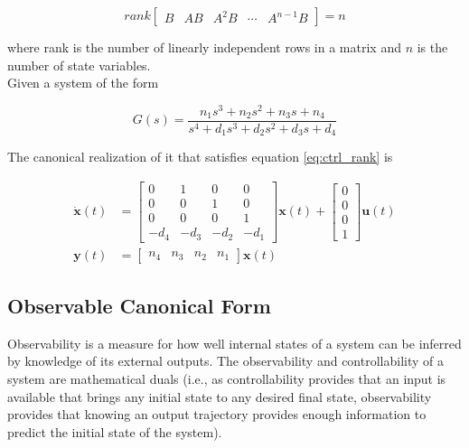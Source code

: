 \documentclass[10pt,conference,compsoc]{IEEEtran}
\newcommand{\mtx}[1] {\bm #1}
\begin{document}
\begin{equation}
  rank \left[
  \begin{array}{ccccc}
    B & AB & A^2B & \cdots & A^{n-1}B
  \end{array}
  \right] = n
  \label{eq:ctrl_rank}
\end{equation}

\noindent where rank is the number of linearly independent rows in a matrix and
$n$ is the number of state variables. \\

\noindent Given a system of the form

\begin{equation}
  G(s) = \frac{n_1 s^3 + n_2 s^2 + n_3 s + n_4}
    {s^4 + d_1 s^3 + d_2 s^2 + d_3 s + d_4}
  \label{eq:ctrl_obsv_tf}
\end{equation}

\noindent The canonical realization of it that satisfies equation
\ref{eq:ctrl_rank} is

\begin{align}
  \dot{\mtx{x}}(t) &= \left[
  \begin{array}{cccc}
    0 & 1 & 0 & 0 \\
    0 & 0 & 1 & 0 \\
    0 & 0 & 0 & 1 \\
    -d_4 & -d_3 & -d_2 & -d_1
  \end{array}
  \right] \mtx{x}(t) + \left[
  \begin{array}{c}
    0 \\
    0 \\
    0 \\
    1
  \end{array}
  \right] \mtx{u}(t) \\
  \mtx{y}(t) &= \left[
  \begin{array}{cccc}
    n_4 & n_3 & n_2 & n_1
  \end{array}
  \right] \mtx{x}(t)
\end{align}

\subsection{Observable Canonical Form}

\noindent Observability is a measure for how well internal states of a system
can be inferred by knowledge of its external outputs. The observability and
controllability of a system are mathematical duals (i.e., as controllability
provides that an input is available that brings any initial state to any desired
final state, observability provides that knowing an output trajectory provides
enough information to predict the initial state of the system).
\end{document}
